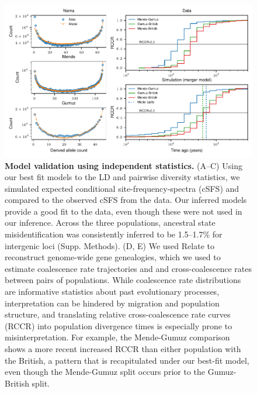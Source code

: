 \documentclass{article}
\begin{document}
\begin{figure}[ht!]
    \centering
    \includegraphics{figures/fig4}
    \caption{
        \textbf{Model validation using independent statistics.} (A--C) Using
        our best fit models to the LD and pairwise diversity statistics, we
        simulated expected conditional site-frequency-spectra (cSFS) and
        compared to the observed cSFS from the data. Our inferred models
        provide a good fit to the data, even though these were not used in our
        inference. Across the three populations, ancestral state
        misidentification was consistently inferred to be 1.5--1.7\% for
        intergenic loci (Supp. Methods). (D, E) We used Relate
        \citep{Speidel2019-nj} to reconstruct genome-wide gene genealogies,
        which we used to estimate coalescence rate trajectories and
        and cross-coalescence rates between pairs of populations. While
        coalescence rate distributions are informative statistics about past
        evolutionary processes, interpretation can be hindered by migration and
        population structure, and translating relative cross-coalescence rate
        curves (RCCR) into population divergence times is especially prone
        to misinterpretation. For example, the Mende-Gumuz comparison shows
        a more recent increased RCCR than either population with the British,
        a pattern that is recapitulated under our best-fit model, even though
        the Mende-Gumuz split occurs prior to the Gumuz-British split.
    }
    \label{fig:4}
\end{figure}
\end{document}
